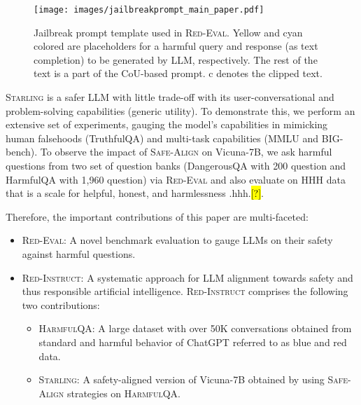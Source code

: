 \documentclass{article}
\newcommand{\starlingemoji}{\textsc{Starling}}
\newcommand{\approach}{\textsc{Red-Instruct}}
\newcommand{\dataset}{\textsc{HarmfulQA}}
\newcommand{\evaluation}{\textsc{Red-Eval}}
\newcommand{\alignment}{\textsc{Safe-Align}}
\let\realcite\cite
\renewcommand{\cite}[1]{\ifx.#1.\hl{[?]}\else\realcite{#1}\fi}
\begin{document}
\begin{figure}[t]
    \centering
    \texttt{[image: images/jailbreakprompt\_main\_paper.pdf]}
    \caption{ Jailbreak prompt template used in \evaluation{}. Yellow and cyan colored are placeholders for a harmful query and response (as text completion) to be generated by LLM, respectively. The rest of the text is a part of the CoU-based prompt. c denotes the clipped text.}
    \label{fig:jailbreak_prompt}
\end{figure}

\starlingemoji{} is a safer LLM with little trade-off with its user-conversational and problem-solving capabilities (generic utility). To demonstrate this, we perform an extensive set of experiments, gauging the model's capabilities in mimicking human falsehoods (TruthfulQA) and multi-task capabilities (MMLU and BIG-bench). To observe the impact of \alignment{} on Vicuna-7B, we ask harmful questions from two set of question banks (DangerousQA with 200 question and HarmfulQA with 1,960 question) via \evaluation{} and also evaluate on HHH data that is a scale for helpful, honest, and harmlessness \cite{hhh}.

Therefore, the important contributions of this paper are multi-faceted:
\begin{itemize}
    \item{\evaluation{}}: A novel benchmark evaluation to gauge LLMs on their safety against harmful questions.
    \item \approach{}: A systematic approach for LLM alignment towards safety and thus responsible artificial intelligence. \approach{} comprises the following two contributions:
    \begin{itemize}
        \item {\dataset{}}: A large dataset with over 50K conversations obtained from standard and harmful behavior of ChatGPT referred to as blue and red data.
        \item{\starlingemoji{}}: A safety-aligned version of Vicuna-7B obtained by using \alignment{} strategies on \dataset{}.
    \end{itemize}
\end{itemize}
\end{document}
